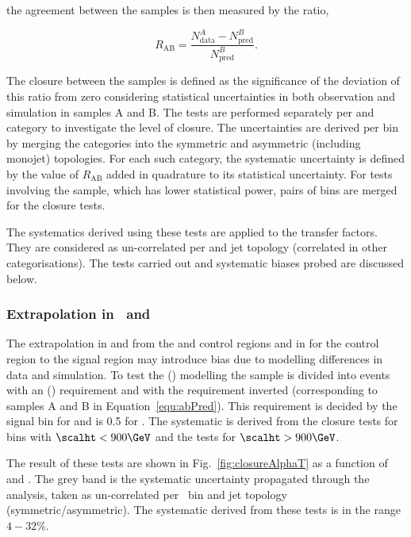 the agreement between the samples is then measured by the ratio, 

\begin{equation}
R_{\text{AB}} = \frac{N^{A}_{\text{data}}-N^{B}_{\text{pred}}}{N^{B}_{\text{pred}}}.
\end{equation}


The closure between the samples is defined as the significance of the deviation of this ratio from zero 
considering statistical uncertainties in both observation and simulation in samples A and B.
The tests are performed separately per \njet and \scalht category to investigate the level of closure. 
The uncertainties are derived per \scalht bin by merging the \njet categories into 
the symmetric and asymmetric (including monojet) topologies. For each such category, the systematic
uncertainty is defined by the value of $R_{\text{AB}}$ added in quadrature to its statistical uncertainty.
For tests involving the \mmj sample, which has lower statistical power, pairs of \scalht bins 
are merged for the closure tests. 

The systematics derived using these tests are applied to the transfer factors. They are considered
as un-correlated per \scalht and jet topology (correlated in other categorisations). The tests carried 
out and systematic biases probed are discussed below.

\subsubsection{Extrapolation in \alphat~and \bdphi}

The extrapolation in \alphat and \bdphi from the \mj and \mmj control regions 
and in \bdphi for the \gj control region to the signal region may introduce bias
 due to modelling differences in data and simulation. To test the \alphat (\bdphi) modelling the \mj sample is divided 
into events with an \alphat (\bdphi) requirement and with the requirement inverted (corresponding
to samples A and B in Equation~\ref{equ:abPred}). This requirement is decided by the signal \scalht bin for 
\alphat and is 0.5 for \bdphi. The systematic is derived from the \alphat closure tests for
bins with $\scalht < 900 \GeV$ and the \bdphi tests for $\scalht > 900 \GeV$.

The result of these tests are shown in Fig.~\ref{fig:closureAlphaT} as a function of \scalht and \njet. 
The grey band is the systematic uncertainty propagated through the analysis, 
taken as un-correlated per \scalht~bin and jet topology
(symmetric/asymmetric). The systematic derived from these tests is
in the range $4-32\%$.

